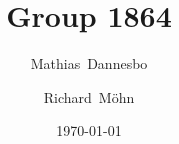 \documentclass[xcolor=svgnames,9pt]{beamer}
\begin{document}
\title{Group 1864}

\author{Mathias~Dannesbo \and Richard~Möhn}

\date{\today}


\begin{frame}
  \titlepage
\end{frame}

\begin{frame}
  
  
\end{frame}

\begin{frame}
  
  
\end{frame}


\begin{frame}
  
  
\end{frame}
\end{document}
